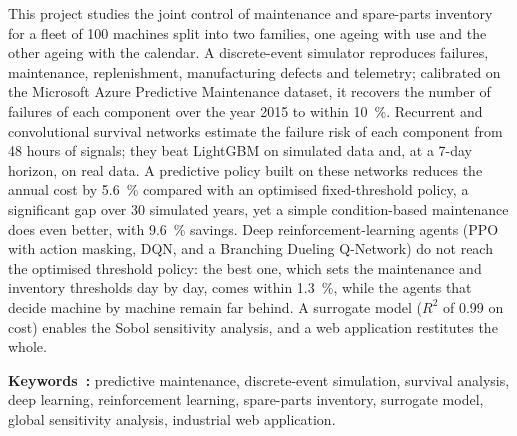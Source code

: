 This project studies the joint control of maintenance and spare-parts inventory for a fleet of 100
machines split into two families, one ageing with use and the other ageing with the calendar. A
discrete-event simulator reproduces failures, maintenance, replenishment, manufacturing defects and
telemetry; calibrated on the Microsoft Azure Predictive Maintenance dataset, it recovers the number
of failures of each component over the year 2015 to within 10~\%. Recurrent and convolutional
survival networks estimate the failure risk of each component from 48 hours of signals; they beat
LightGBM on simulated data and, at a 7-day horizon, on real data. A predictive policy built on these
networks reduces the annual cost by 5.6~\% compared with an optimised fixed-threshold policy, a
significant gap over 30 simulated years, yet a simple condition-based maintenance does even better,
with 9.6~\% savings. Deep reinforcement-learning agents (PPO with action masking, DQN, and a
Branching Dueling Q-Network) do not reach the optimised threshold policy: the best one, which sets
the maintenance and inventory thresholds day by day, comes within 1.3~\%, while the agents that
decide machine by machine remain far behind. A surrogate model ($R^2$ of 0.99 on cost) enables the
Sobol sensitivity analysis, and a web application restitutes the whole.

\vspace{0.8em}
\noindent\textbf{Keywords~:} predictive maintenance, discrete-event simulation, survival analysis,
deep learning, reinforcement learning, spare-parts inventory, surrogate model, global sensitivity
analysis, industrial web application.

